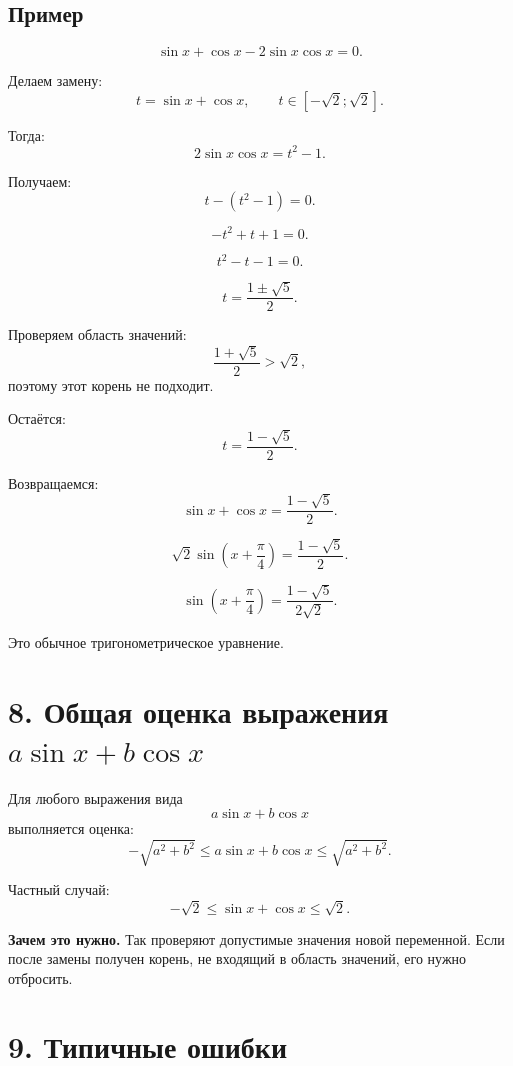 \documentclass[a4paper,12pt]{article}
\newcommand{\sectionline}{\vspace{2mm}{\color{linegray}\hrule height 0.5pt}\vspace{2mm}}
\newcommand{\important}[1]{\textcolor{darkaccent}{\textbf{#1}}}
\begin{document}
\subsection*{\textcolor{darkaccent}{Пример}}

\[
\sin x+\cos x-2\sin x\cos x=0.
\]

Делаем замену:
\[
t=\sin x+\cos x,\qquad t\in[-\sqrt2;\sqrt2].
\]

Тогда:
\[
2\sin x\cos x=t^2-1.
\]

Получаем:
\[
t-(t^2-1)=0.
\]

\[
-t^2+t+1=0.
\]

\[
t^2-t-1=0.
\]

\[
t=\frac{1\pm\sqrt5}{2}.
\]

Проверяем область значений:
\[
\frac{1+\sqrt5}{2}>\sqrt2,
\]
поэтому этот корень не подходит.

Остаётся:
\[
t=\frac{1-\sqrt5}{2}.
\]

Возвращаемся:
\[
\sin x+\cos x=\frac{1-\sqrt5}{2}.
\]

\[
\sqrt2\sin\left(x+\frac{\pi}{4}\right)=\frac{1-\sqrt5}{2}.
\]

\[
\sin\left(x+\frac{\pi}{4}\right)=\frac{1-\sqrt5}{2\sqrt2}.
\]

Это обычное тригонометрическое уравнение.

\sectionline

\section*{\textcolor{darkaccent}{8. Общая оценка выражения \texorpdfstring{$a\sin x+b\cos x$}{a sin x + b cos x}}}

Для любого выражения вида
\[
a\sin x+b\cos x
\]
выполняется оценка:
\[
-\sqrt{a^2+b^2}
\le
a\sin x+b\cos x
\le
\sqrt{a^2+b^2}.
\]

Частный случай:
\[
-\sqrt2\le \sin x+\cos x\le\sqrt2.
\]

\important{Зачем это нужно.}
Так проверяют допустимые значения новой переменной. Если после замены получен корень, не входящий в область значений, его нужно отбросить.

\sectionline

\section*{\textcolor{darkaccent}{9. Типичные ошибки}}
\end{document}
